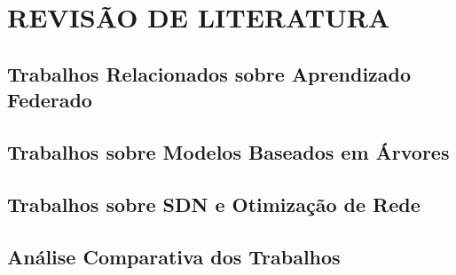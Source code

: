 \section{REVISÃO DE LITERATURA}

\subsection{Trabalhos Relacionados sobre Aprendizado Federado}

\subsection{Trabalhos sobre Modelos Baseados em Árvores}

\subsection{Trabalhos sobre SDN e Otimização de Rede}

\subsection{Análise Comparativa dos Trabalhos}

